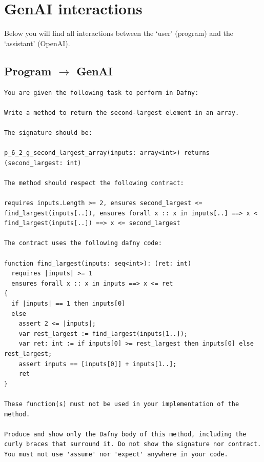 \documentclass{article}
\begin{document}
\section*{GenAI interactions}
Below you will find all interactions between the `user' (program) and the `assistant' (OpenAI).
\subsection*{Program $\rightarrow$ GenAI}
\begin{lstlisting}
You are given the following task to perform in Dafny:

Write a method to return the second-largest element in an array.

The signature should be:

p_6_2_g_second_largest_array(inputs: array<int>) returns (second_largest: int)

The method should respect the following contract:

requires inputs.Length >= 2, ensures second_largest <= find_largest(inputs[..]), ensures forall x :: x in inputs[..] ==> x < find_largest(inputs[..]) ==> x <= second_largest

The contract uses the following dafny code:

function find_largest(inputs: seq<int>): (ret: int)
  requires |inputs| >= 1
  ensures forall x :: x in inputs ==> x <= ret
{
  if |inputs| == 1 then inputs[0]
  else 
    assert 2 <= |inputs|;
    var rest_largest := find_largest(inputs[1..]);
    var ret: int := if inputs[0] >= rest_largest then inputs[0] else rest_largest;
    assert inputs == [inputs[0]] + inputs[1..]; 
    ret 
} 

These function(s) must not be used in your implementation of the method.

Produce and show only the Dafny body of this method, including the curly braces that surround it. Do not show the signature nor contract. You must not use 'assume' nor 'expect' anywhere in your code.
\end{lstlisting}
\end{document}
